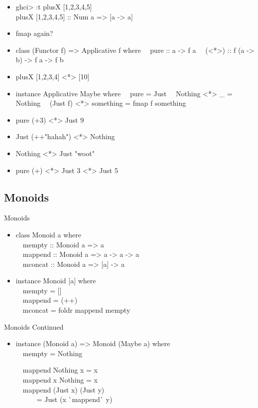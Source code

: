 \documentclass{beamer}                  %
\newcommand{\srule}{
	\rule{\textwidth}{1pt}\\
}
\newlength{\subsecwidth}
\newenvironment{slide}{
	\begin{frame} %
	\settowidth{\subsecwidth}{\insertsubsection} %
	\ifthenelse{\dimtest{\subsecwidth}{<}{1pt}}{ %
		\frametitle{\insertsection\\             %
		\vspace{-1ex}                            %
		\color{fore}\srule                       %
		\par                                     %
		\vspace{-3ex}                            %
		}
	}{                                           %
		\frametitle{\insertsection\ -- \insertsubsection\\ %
		\vspace{-1ex}                            %
		\color{fore}\srule                       %
		\par                                     %
		\vspace{-3ex}                            %
		}
	}
	\Large                                       %
}{
	\end{frame}
}
\begin{document}
\begin{slide}
  \begin{itemize}
    \item ghci> :t plusX [1,2,3,4,5]\\
      plusX [1,2,3,4,5] :: Num a => [a -> a]
    \item fmap again?
    \item
      class (Functor f) => Applicative f where
      ~~pure :: a -> f a
      ~~(<*>) :: f (a -> b) -> f a -> f b
    \item
      plusX [1,2,3,4] <*> [10]
  \end{itemize}
\end{slide}

\begin{slide}
  \begin{itemize}
    \item
      instance Applicative Maybe where
      ~~pure = Just
      ~~Nothing <*> _ = Nothing
      ~~(Just f) <*> something = fmap f something
    \item pure (+3) <*> Just 9
    \item Just (++"hahah") <*> Nothing
    \item Nothing <*> Just "woot"
    \item pure (+) <*> Just 3 <*> Just 5
  \end{itemize}
\end{slide}


\subsection{Monoids}

\begin{slide}
  Monoids
  \begin{itemize}
    \item
      class Monoid a where\\
      ~~mempty :: Monoid a => a\\
      ~~mappend :: Monoid a => a -> a -> a\\
      ~~mconcat :: Monoid a => [a] -> a
    \item
      instance Monoid [a] where\\
      ~~mempty = []\\
      ~~mappend = (++)\\
      ~~mconcat = foldr mappend mempty
  \end{itemize}
\end{slide}

\begin{slide}
  Monoids Continued
  \begin{itemize}
    \item
      instance (Monoid a) => Monoid (Maybe a) where\\
      ~~mempty = Nothing

      ~~mappend Nothing x = x\\
      ~~mappend x Nothing = x\\
      ~~mappend (Just x) (Just y)\\
      ~~~~~~= Just (x \`{}mappend\`{} y)
  \end{itemize}
\end{slide}
\end{document}
